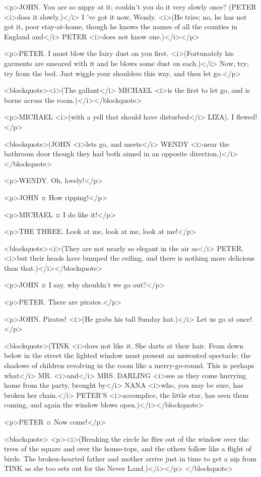 <p>JOHN. You are so nippy at it; couldn't you do it very slowly once? (PETER <i>does it slowly.)</i> I 've got it now, Wendy. <i>(He tries; no, he has not got it, poor stay-at-home, though he knows the names of all the counties in England and</i> PETER <i>does not know one.)</i></p>

<p>PETER. I must blow the fairy dust on you first. <i>(Fortunately his garments are smeared with it and he blows some dust on each.)</i> Now, try; try from the bed. Just wiggle your shoulders this way, and then let go.</p>

<blockquote><i>(The gallant</i> MICHAEL <i>is the first to let go, and is borne across the room.)</i></blockquote>

<p>MICHAEL <i>(with a yell that should have disturbed</i> LIZA). I flewed!</p>

<blockquote>(JOHN <i>lets go, and meets</i> WENDY <i>near the bathroom door though they had both aimed in an opposite direction.)</i></blockquote>

<p>WENDY. Oh, lovely!</p>

<p>JOHN ¤
How ripping!</p>

<p>MICHAEL ¤
I do like it!</p>

<p>THE THREE. Look at me, look at me, look at me!</p>

<blockquote><i>(They are not nearly so elegant in the air as</i> PETER, <i>but their heads have bumped the ceiling, and there is nothing more delicious than that.)</i></blockquote>

<p>JOHN ¤
I say, why shouldn't we go out?</p>

<p>PETER. There are pirates.</p>

<p>JOHN. Pirates! <i>(He grabs his tall Sunday hat.)</i> Let us go at once!</p>

<blockquote>(TINK <i>does not like it. She darts at their hair. From down below in the street the lighted window must present an unwonted spectacle: the shadows of children revolving in the room like a merry-go-round. This is perhaps what</i> MR. <i>and</i> MRS. DARLING <i>see as they come hurrying home from the party, brought by</i> NANA <i>who, you may be sure, has broken her chain.</i> PETER'S <i>accomplice, the little star, has seen them coming, and again the window blows open.)</i></blockquote>

<p>PETER ¤
Now come!</p>

<blockquote> <p><i>(Breaking the circle he flies out of the window over the trees of the square and over the house-tops, and the others follow like a flight of birds. The broken-hearted father and mother arrive just in time to get a nip from TINK as she too sets out for the Never Land.)</i></p> </blockquote>
